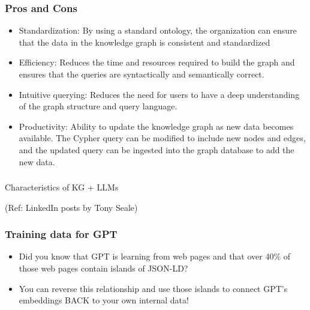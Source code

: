 \begin{frame}[fragile]\frametitle{Pros and Cons}

\begin{itemize}
\item Standardization: By using a standard ontology, the organization can ensure that the data in the knowledge graph is consistent and standardized
\item Efficiency: Reduces the time and resources required to build the graph and ensures that the queries are syntactically and semantically correct.
\item Intuitive querying: Reduces the need for users to have a deep understanding of the graph structure and query language.
\item Productivity: Ability to update the knowledge graph as new data becomes available. The Cypher query can be modified to include new nodes and edges, and the updated query can be ingested into the graph database to add the new data. 
\end{itemize}
\end{frame}


\begin{frame}[fragile]\frametitle{}
\begin{center}
{\Large Characteristics of KG + LLMs}

{\tiny (Ref: LinkedIn posts by Tony Seale)}
\end{center}
\end{frame}

\begin{frame}[fragile]\frametitle{Training data for GPT}

\begin{itemize}
\item Did you know that GPT is learning from web pages and that over 40\% of those web pages contain islands of JSON-LD?
\item You can reverse this relationship and use those islands to connect GPT's embeddings BACK to your own internal data!
\end{itemize}
	  
\end{frame}

